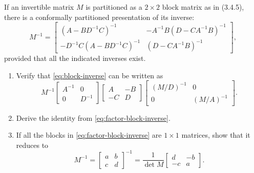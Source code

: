 \documentclass{homework}
\begin{document}
\begin{problem}[P.3.28]
  If an invertible matrix \(M\) is partitioned as a
  \(2\times2\) block matrix as in (3.4.5), there is a conformally
  partitioned presentation of its inverse:
  \begin{equation}
    M^{-1} =
    \begin{bmatrix}
      (A-BD^{-1}C)^{-1}          & -A^{-1} B(D-CA^{-1}B)^{-1} \\
      -D^{-1}C (A-BD^{-1}C)^{-1} & (D-CA^{-1}B)^{-1}
    \end{bmatrix}, \label{eq:block-inverse}
  \end{equation}
  provided that all the indicated inverses exist.
  \begin{enumerate}
  \item Verify that \eqref{eq:block-inverse} can be
    written as
    \begin{equation}
      M^{-1}
      \begin{bmatrix}
        A^{-1} & 0 \\
        0      & D^{-1}
      \end{bmatrix}
      \begin{bmatrix}
        A  & -B \\
        -C & D
      \end{bmatrix}
      \begin{bmatrix}
        (M/D)^{-1} & 0 \\
        0          & (M/A)^{-1}
      \end{bmatrix}. \label{eq:factor-block-inverse}
    \end{equation}

    \begin{solution}
    \end{solution}

  \item Derive the identity from \eqref{eq:factor-block-inverse}.

    \begin{solution}
    \end{solution}

  \item If all the blocks in \eqref{eq:factor-block-inverse} are
    \(1\times1\) matrices, show that it reduces to
    \[
      M^{-1} = \begin{bmatrix}a&b\\c&d\end{bmatrix}^{-1} =
      \frac{1}{\det M} \begin{bmatrix}d&-b\\-c&a\end{bmatrix}.
    \]

    \begin{solution}
    \end{solution}

  \end{enumerate}
\end{problem}
\end{document}
